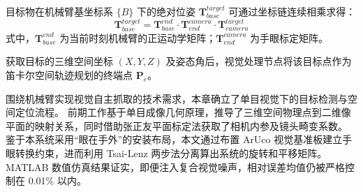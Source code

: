 目标物在机械臂基坐标系 $\{B\}$ 下的绝对位姿 $\mathbf{T}_{base}^{target}$ 可通过坐标链连续相乘求得：
\begin{equation}
\mathbf{T}_{base}^{target} = \mathbf{T}_{base}^{end} \cdot \mathbf{T}_{end}^{camera} \cdot \mathbf{T}_{camera}^{target}
\end{equation}
式中，$\mathbf{T}_{base}^{end}$ 为当前时刻机械臂的正运动学矩阵；$\mathbf{T}_{end}^{camera}$ 为手眼标定矩阵。

获取目标的三维空间坐标 $(X, Y, Z)$ 及姿态角后，视觉处理节点将该目标点作为笛卡尔空间轨迹规划的终端点 $\mathbf{P}_e$。



围绕机械臂实现视觉自主抓取的技术需求，本章确立了单目视觉下的目标检测与空间定位流程。
前期工作基于单目成像几何原理，推导了三维空间物理点到二维像平面的映射关系，同时借助张正友平面标定法获取了相机内参及镜头畸变系数。
鉴于本系统采用“眼在手外”的安装布局，本文通过布置 ArUco 视觉基准板建立手眼转换约束，进而利用 Tsai-Lenz 两步法分离算出系统的旋转和平移矩阵。
MATLAB 数值仿真结果证实，即便注入复合视觉噪声，相对误差均值仍被严格控制在 0.01\% 以内。

